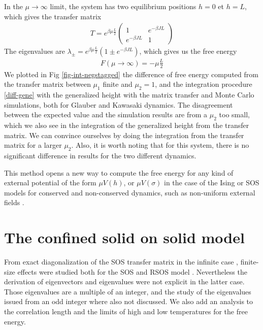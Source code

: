 In the $\mu \rightarrow \infty$ limit, the system has two equilibrium positions $h=0$ et $h=L$, which gives the transfer matrix
\begin{align}
T= e^{\beta \mu \frac{L}{2}}
  \begin{pmatrix}
    1 & e^{-\beta  J L} \\
    e^{-\beta  J L} & 1
  \end{pmatrix}
\end{align}
The eigenvalues are $\lambda_\pm = e^{ \beta \mu \frac{L}{2}}( 1 \pm e^{-\beta J L})$, which gives us the free energy 
\begin{align}
  F(\mu \rightarrow \infty) = - \mu \frac{L}{2}
\end{align}
We plotted in Fig \ref{fig-int-negstagged} the difference of free energy computed from the transfer matrix between $\mu_1$ finite and $\mu_2=1$, and the integration procedure \eqref{diff-gene} with the generalized height with the matrix transfer and Monte Carlo simulations, both for Glauber and Kawasaki dynamics. The disagreement between the expected value and the simulation results are from a $\mu_2$ too small, which we also see in the integration of the generalized height from the transfer matrix. We can convince ourselves by doing the integration from the transfer matrix for a larger $\mu_2$. Also, it is worth noting that for this system, there is no significant difference in results for the two different dynamics.

This method opens a new way to compute the free energy for any kind of external potential of the form $\mu V(h)$, or $\mu V(\sigma)$ in the case of the Ising or SOS models for conserved and non-conserved dynamics, such as non-uniform external fields \cite{bissacot_phase_2010}. 



\section{The confined solid on solid model}


From exact diagonalization of the SOS transfer matrix in the infinite case \cite{guyer_sine-gordon_1979}, finite-size effects were studied both for the SOS and RSOS model \cite{svrakic_finite-size_1988,privman_finite-size_1988}. Nevertheless the derivation of eigenvectors and eigenvalues were not explicit in the latter case. Those eigenvalues are a multiple of an integer, and the study of the eigenvalues issued from an odd integer where also not discussed. We also add an analysis to the correlation length and the limits of high and low temperatures for the free energy. 

